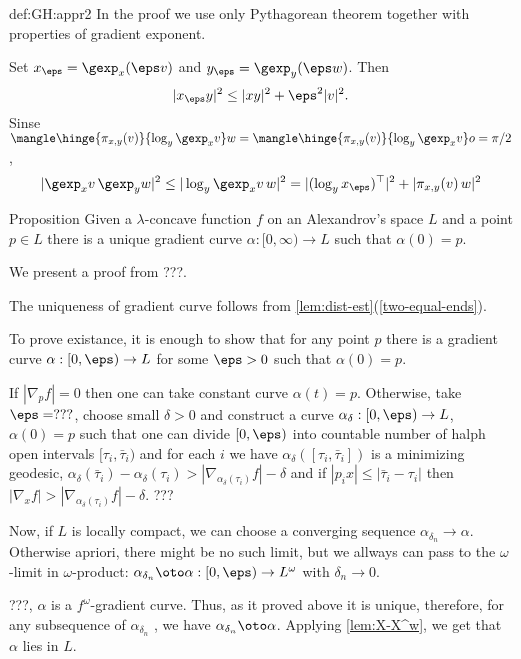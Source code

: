 {\begin{subthm}{def:GH:appr2}
In the proof we use only Pythagorean theorem together with properties of gradient exponent.

Set $x_\eps=\gexp_x(\eps v)$ and $y_\eps=\gexp_y(\eps w)$.
Then 
$$|x_\eps y|^2\le|xy|^2+\eps^2|v|^2.$$
Sinse $\mangle\hinge{\pi_{x,y}(v)}{\log_y\gexp_xv}w=\mangle\hinge{\pi_{x,y}(v)}{\log_y\gexp_xv}o=\pi/2$,
$$|\gexp_xv\,\gexp_yw|^2\le
|\log_y\gexp_xv\, w|^2=
|(\log_yx_\eps)^\top|^2+|\pi_{x,y}(v)\, w|^2$$



















\begin{thm}{Proposition}\label{grad-constr}  Given a $\lambda$-concave
function $f$ on an Alexandrov's space $L$ and a point $p\in L$ there is a unique
gradient curve $\alpha: [0,\infty) \to L$ such that $\alpha(0)=p$. 
\end{thm} 

We present a proof from ???.

 The uniqueness of gradient curve follows from \ref{lem:dist-est}(\ref{two-equal-ends}).

To prove existance, it is enough to show that for any point $p$ there is a gradient curve $\alpha: [0,\eps) \to L$ for some $\eps>0$ such that $\alpha(0)=p$.

If $|\nabla_pf|=0$ then one can take constant curve $\alpha(t)=p$.
Otherwise, take $\eps=???$, choose small $\delta>0$ and construct a curve $\alpha_\delta:[0,\eps) \to L$, $\alpha(0)=p$ such that one can divide $[0,\eps)$ into countable number of halph open intervals $[\tau_i,\bar\tau_i)$ and for each $i$ we have $\alpha_\delta([\tau_i,\bar\tau_i])$ is a minimizing geodesic, 
$\alpha_\delta(\bar\tau_i)-\alpha_\delta(\tau_i)>|\nabla_{\alpha_\delta(\tau_i)}f|-\delta$ and if $|p_ix|\le|\bar\tau_i-\tau_i|$ then $|\nabla_x f|>|\nabla_{\alpha_\delta(\tau_i)}f|-\delta$.
???

Now, if $L$ is locally compact, we can choose a converging sequence $\alpha_{\delta_n}\to \alpha$.
Otherwise apriori, there might be no such limit, but we allways can pass to the $\omega$-limit in $\omega$-product:
$\alpha_{\delta_n}\oto\alpha:[0,\eps)\to L^\omega$ with $\delta_n\to 0$.

???, $\alpha$ is a $f^\omega$-gradient curve.
Thus, as it proved above it is unique, therefore, for any subsequence of $\alpha_{\delta_n}$ , we have $\alpha_{\delta_n}\oto\alpha$.
Applying \ref{lem:X-X^w}, we get that $\alpha$ lies in $L$.


















\end{subthm}}
